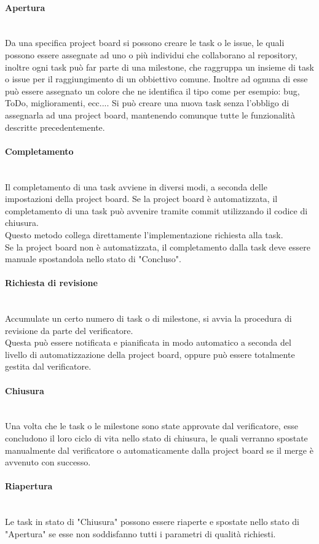 \paragraph{Apertura} \-\\
	Da una specifica project board si possono creare le task o le issue\glossario, le quali possono essere assegnate ad uno o più individui che collaborano al repository, inoltre ogni task può far parte di una milestone, che raggruppa un insieme di task o issue per il raggiungimento di un obbiettivo comune. 
	Inoltre ad ognuna di esse può essere assegnato un colore che ne identifica il tipo come per esempio: bug, ToDo, miglioramenti, ecc.... 
	Si può creare una nuova task senza l'obbligo di assegnarla ad una project board, mantenendo comunque tutte le funzionalità descritte precedentemente. 

\paragraph{Completamento} \-\\\label{ProcessiSupporto_GestioneProgetto_CicloTask_Completamento}
	Il completamento di una task avviene in diversi modi, a seconda delle impostazioni della project board. 
	Se la project board è automatizzata, il completamento di una task può avvenire tramite commit utilizzando il codice di chiusura. \\
	Questo metodo collega direttamente l'implementazione richiesta alla task. \\
	Se la project board non è automatizzata, il completamento dalla task deve essere manuale spostandola nello stato di "Concluso". 
	
\paragraph{Richiesta di revisione} \-\\
	Accumulate un certo numero di task o di milestone, si avvia la procedura di revisione da parte del verificatore. \\ Questa può essere notificata e pianificata in modo automatico a seconda del livello di automatizzazione della project board, oppure può essere totalmente gestita dal verificatore. 
	
	
	\paragraph{Chiusura} \-\\
	Una volta che le task o le milestone sono state approvate dal verificatore, esse concludono il loro ciclo di vita nello stato di chiusura, le quali verranno spostate manualmente dal verificatore o automaticamente dalla project board se il merge è avvenuto con successo. 
	
\paragraph{Riapertura} \-\\
	Le task in stato di "Chiusura" possono essere riaperte e spostate nello stato di "Apertura" se esse non soddisfanno tutti i parametri di qualità richiesti.
	